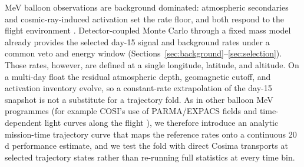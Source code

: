 \documentclass[11pt]{article}
\begin{document}
MeV balloon observations are background dominated: atmospheric secondaries and cosmic-ray-induced activation set the rate floor, and both respond to the flight environment \cite{Gallego2025Balloon,Kierans2017}. Detector-coupled Monte Carlo through a fixed mass model already provides the selected day-15 signal and background rates under a common veto and energy window (Sections~\ref{sec:background}--\ref{sec:selection}). Those rates, however, are defined at a single longitude, latitude, and altitude. On a multi-day float the residual atmospheric depth, geomagnetic cutoff, and activation inventory evolve, so a constant-rate extrapolation of the day-15 snapshot is not a substitute for a trajectory fold. As in other balloon MeV programmes (for example COSI's use of PARMA/EXPACS fields and time-dependent light curves along the flight \cite{Gallego2025Balloon}), we therefore introduce an analytic mission-time trajectory curve that maps the reference rates onto a continuous 20\,d performance estimate, and we test the fold with direct Cosima transports at selected trajectory states rather than re-running full statistics at every time bin.
\end{document}
